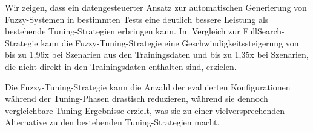 \smallskip

Wir zeigen, dass ein datengesteuerter Ansatz zur automatischen Generierung von Fuzzy-Systemen in bestimmten Tests eine deutlich bessere Leistung als bestehende Tuning-Strategien erbringen kann. Im Vergleich zur FullSearch-Strategie kann die Fuzzy-Tuning-Strategie eine Geschwindigkeitssteigerung von bis zu 1,96x bei Szenarien aus den Trainingsdaten und bis zu 1,35x bei Szenarien, die nicht direkt in den Trainingsdaten enthalten sind, erzielen.

\smallskip

Die Fuzzy-Tuning-Strategie kann die Anzahl der evaluierten Konfigurationen während der Tuning-Phasen drastisch reduzieren, während sie dennoch vergleichbare Tuning-Ergebnisse erzielt, was sie zu einer vielversprechenden Alternative zu den bestehenden Tuning-Strategien macht.


\cleardoublepage